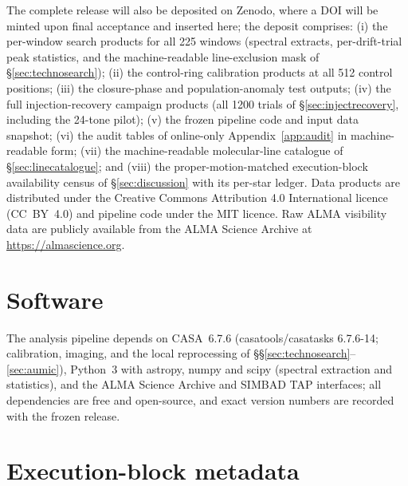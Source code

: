 \documentclass{openjournal}
\begin{document}
The complete release will also be deposited on Zenodo, where a DOI
will be minted upon final acceptance and inserted here; the deposit
comprises: (i) the per-window search products for all 225 windows
(spectral extracts, per-drift-trial peak statistics, and the
machine-readable line-exclusion mask of \S\ref{sec:technosearch});
(ii) the control-ring calibration products at all 512 control
positions; (iii) the closure-phase and population-anomaly test
outputs; (iv) the full injection-recovery campaign products (all 1200
trials of \S\ref{sec:injectrecovery}, including the 24-tone pilot);
(v) the frozen pipeline code and input data snapshot; (vi) the audit
tables of online-only Appendix~\ref{app:audit} in machine-readable
form; (vii) the machine-readable molecular-line catalogue of
\S\ref{sec:linecatalogue}; and (viii) the proper-motion-matched
execution-block availability census of \S\ref{sec:discussion} with
its per-star ledger. Data products are distributed under the Creative
Commons Attribution 4.0 International licence (CC~BY~4.0) and
pipeline code under the MIT licence. Raw ALMA visibility data are
publicly available from the ALMA Science Archive at
\url{https://almascience.org}.

\section*{Software}
The analysis pipeline depends on CASA~6.7.6 (casatools/casatasks
6.7.6-14; calibration, imaging, and the local reprocessing of
\S\S\ref{sec:technosearch}--\ref{sec:aumic}), Python~3 with astropy,
numpy and scipy (spectral extraction and statistics), and the ALMA
Science Archive and SIMBAD TAP interfaces; all dependencies are free
and open-source, and exact version numbers are recorded with the
frozen release.


\appendix
\section{Execution-block metadata}
\label{app:ebs}
\end{document}
